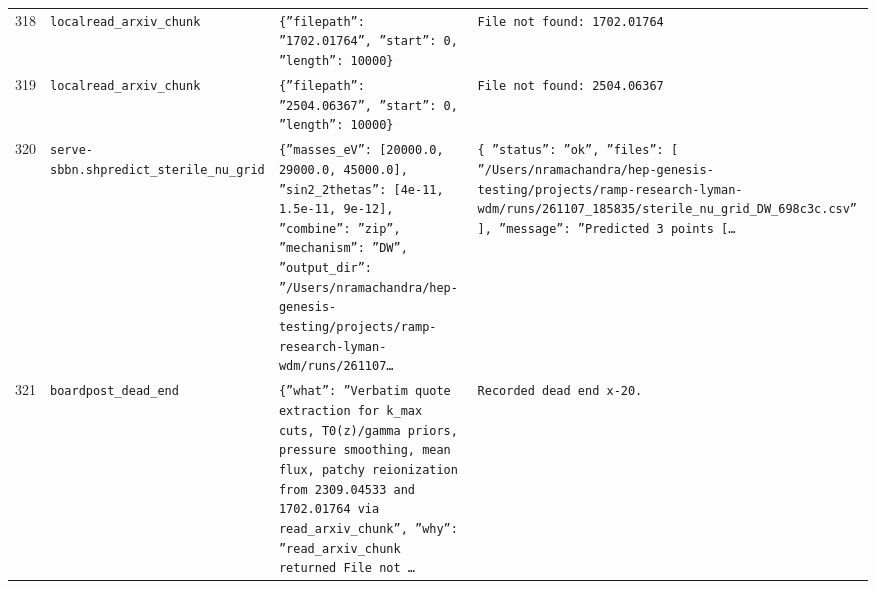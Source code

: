 \documentclass[11pt,a4paper]{article}
\begin{document}
\begin{longtable}{@{}p{}p{}p{}p{}@{}}
318 & \texttt{local}\newline\texttt{read\_\allowbreak{}arxiv\_\allowbreak{}chunk} & \texttt{\{''filepath'':\allowbreak{} ''1702.01764'',\allowbreak{} ''start'':\allowbreak{} 0,\allowbreak{} ''length'':\allowbreak{} 10000\}\allowbreak{}} & \texttt{File not found:\allowbreak{} 1702.01764} \\
319 & \texttt{local}\newline\texttt{read\_\allowbreak{}arxiv\_\allowbreak{}chunk} & \texttt{\{''filepath'':\allowbreak{} ''2504.06367'',\allowbreak{} ''start'':\allowbreak{} 0,\allowbreak{} ''length'':\allowbreak{} 10000\}\allowbreak{}} & \texttt{File not found:\allowbreak{} 2504.06367} \\
320 & \texttt{serve-sbbn.sh}\newline\texttt{predict\_\allowbreak{}sterile\_\allowbreak{}nu\_\allowbreak{}grid} & \texttt{\{''masses\_\allowbreak{}eV'':\allowbreak{} [20000.0,\allowbreak{} 29000.0,\allowbreak{} 45000.0]\allowbreak{},\allowbreak{} ''sin2\_\allowbreak{}2thetas'':\allowbreak{} [4e-11,\allowbreak{} 1.5e-11,\allowbreak{} 9e-12]\allowbreak{},\allowbreak{} ''combine'':\allowbreak{} ''zip'',\allowbreak{} ''mechanism'':\allowbreak{} ''DW'',\allowbreak{} ''output\_\allowbreak{}dir'':\allowbreak{} ''/\allowbreak{}Users/\allowbreak{}nramachandra/\allowbreak{}hep-genesis-testing/\allowbreak{}projects/\allowbreak{}ramp-research-lyman-wdm/\allowbreak{}runs/\allowbreak{}261107\ldots{}\allowbreak{}} & \texttt{\{   ''status'':\allowbreak{} ''ok'',\allowbreak{}   ''files'':\allowbreak{} [     ''/\allowbreak{}Users/\allowbreak{}nramachandra/\allowbreak{}hep-genesis-testing/\allowbreak{}projects/\allowbreak{}ramp-research-lyman-wdm/\allowbreak{}runs/\allowbreak{}261107\_\allowbreak{}185835/\allowbreak{}sterile\_\allowbreak{}nu\_\allowbreak{}grid\_\allowbreak{}DW\_\allowbreak{}698c3c.csv''   ]\allowbreak{},\allowbreak{}   ''message'':\allowbreak{} ''Predicted 3 points [\ldots{}\allowbreak{}} \\
321 & \texttt{board}\newline\texttt{post\_\allowbreak{}dead\_\allowbreak{}end} & \texttt{\{''what'':\allowbreak{} ''Verbatim quote extraction for k\_\allowbreak{}max cuts,\allowbreak{} T0(z)\allowbreak{}/\allowbreak{}gamma priors,\allowbreak{} pressure smoothing,\allowbreak{} mean flux,\allowbreak{} patchy reionization from 2309.04533 and 1702.01764 via read\_\allowbreak{}arxiv\_\allowbreak{}chunk'',\allowbreak{} ''why'':\allowbreak{} ''read\_\allowbreak{}arxiv\_\allowbreak{}chunk returned File not \ldots{}\allowbreak{}} & \texttt{Recorded dead end x-20.} \\

\end{longtable}
\end{document}
